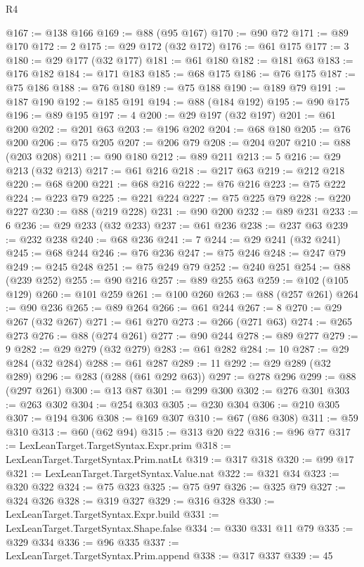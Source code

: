 \begin{lexlean}{R4}
\begin{coremodule}
@167 := @138 @166
@169 := @88 (@95 @167)
@170 := @90 @72
@171 := @89 @170
@172 := 2
@175 := @29 @172 (@32 @172)
@176 := @61 @175
@177 := 3
@180 := @29 @177 (@32 @177)
@181 := @61 @180
@182 := @181 @63
@183 := @176 @182
@184 := @171 @183
@185 := @68 @175
@186 := @76 @175
@187 := @75 @186
@188 := @76 @180
@189 := @75 @188
@190 := @189 @79
@191 := @187 @190
@192 := @185 @191
@194 := @88 (@184 @192)
@195 := @90 @175
@196 := @89 @195
@197 := 4
@200 := @29 @197 (@32 @197)
@201 := @61 @200
@202 := @201 @63
@203 := @196 @202
@204 := @68 @180
@205 := @76 @200
@206 := @75 @205
@207 := @206 @79
@208 := @204 @207
@210 := @88 (@203 @208)
@211 := @90 @180
@212 := @89 @211
@213 := 5
@216 := @29 @213 (@32 @213)
@217 := @61 @216
@218 := @217 @63
@219 := @212 @218
@220 := @68 @200
@221 := @68 @216
@222 := @76 @216
@223 := @75 @222
@224 := @223 @79
@225 := @221 @224
@227 := @75 @225 @79
@228 := @220 @227
@230 := @88 (@219 @228)
@231 := @90 @200
@232 := @89 @231
@233 := 6
@236 := @29 @233 (@32 @233)
@237 := @61 @236
@238 := @237 @63
@239 := @232 @238
@240 := @68 @236
@241 := 7
@244 := @29 @241 (@32 @241)
@245 := @68 @244
@246 := @76 @236
@247 := @75 @246
@248 := @247 @79
@249 := @245 @248
@251 := @75 @249 @79
@252 := @240 @251
@254 := @88 (@239 @252)
@255 := @90 @216
@257 := @89 @255 @63
@259 := @102 (@105 @129)
@260 := @101 @259
@261 := @100 @260
@263 := @88 (@257 @261)
@264 := @90 @236
@265 := @89 @264
@266 := @61 @244
@267 := 8
@270 := @29 @267 (@32 @267)
@271 := @61 @270
@273 := @266 (@271 @63)
@274 := @265 @273
@276 := @88 (@274 @261)
@277 := @90 @244
@278 := @89 @277
@279 := 9
@282 := @29 @279 (@32 @279)
@283 := @61 @282
@284 := 10
@287 := @29 @284 (@32 @284)
@288 := @61 @287
@289 := 11
@292 := @29 @289 (@32 @289)
@296 := @283 (@288 (@61 @292 @63))
@297 := @278 @296
@299 := @88 (@297 @261)
@300 := @13 @87
@301 := @299 @300
@302 := @276 @301
@303 := @263 @302
@304 := @254 @303
@305 := @230 @304
@306 := @210 @305
@307 := @194 @306
@308 := @169 @307
@310 := @67 (@86 @308)
@311 := @59 @310
@313 := @60 (@62 @94)
@315 := @313 @20 @22
@316 := @96 @77
@317 := LexLeanTarget.TargetSyntax.Expr.prim
@318 := LexLeanTarget.TargetSyntax.Prim.natLt
@319 := @317 @318
@320 := @99 @17
@321 := LexLeanTarget.TargetSyntax.Value.nat
@322 := @321 @34
@323 := @320 @322
@324 := @75 @323
@325 := @75 @97
@326 := @325 @79
@327 := @324 @326
@328 := @319 @327
@329 := @316 @328
@330 := LexLeanTarget.TargetSyntax.Expr.build
@331 := LexLeanTarget.TargetSyntax.Shape.false
@334 := @330 @331 @11 @79
@335 := @329 @334
@336 := @96 @335
@337 := LexLeanTarget.TargetSyntax.Prim.append
@338 := @317 @337
@339 := 45

\end{coremodule}
\end{lexlean}
